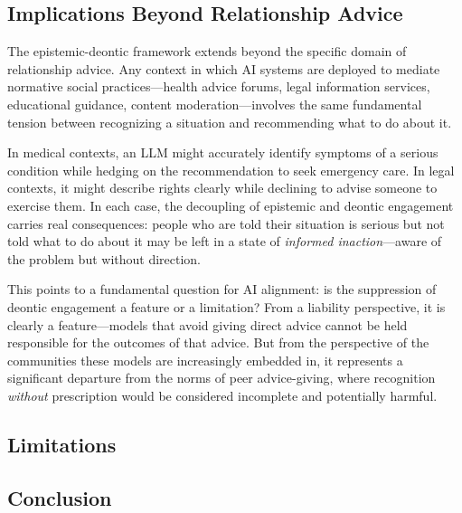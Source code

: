\subsection{Implications Beyond Relationship Advice}

The epistemic-deontic framework extends beyond the specific domain of relationship advice. Any context in which AI systems are deployed to mediate normative social practices---health advice forums, legal information services, educational guidance, content moderation---involves the same fundamental tension between recognizing a situation and recommending what to do about it.

In medical contexts, an LLM might accurately identify symptoms of a serious condition while hedging on the recommendation to seek emergency care. In legal contexts, it might describe rights clearly while declining to advise someone to exercise them. In each case, the decoupling of epistemic and deontic engagement carries real consequences: people who are told their situation is serious but not told what to do about it may be left in a state of \textit{informed inaction}---aware of the problem but without direction.

This points to a fundamental question for AI alignment: is the suppression of deontic engagement a feature or a limitation? From a liability perspective, it is clearly a feature---models that avoid giving direct advice cannot be held responsible for the outcomes of that advice. But from the perspective of the communities these models are increasingly embedded in, it represents a significant departure from the norms of peer advice-giving, where recognition \textit{without} prescription would be considered incomplete and potentially harmful.

\subsection{Limitations}


\subsection{Conclusion}

